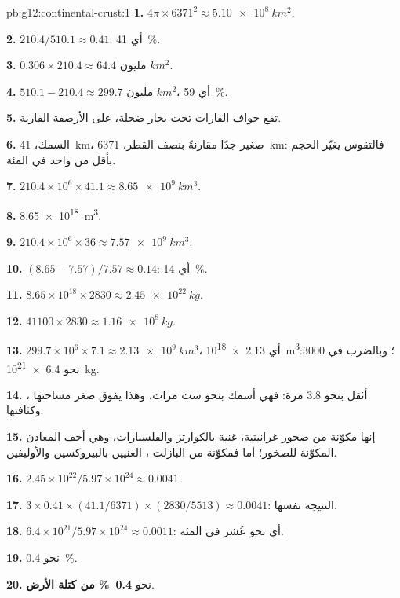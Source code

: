 \begin{solution}{pb:g12:continental-crust:1}
\textbf{1.} $4\pi \times 6371^2 \approx \qty{5.10e8}{km^2}$.

\textbf{2.} $210.4/510.1 \approx 0.41$: أي \qty{41}{\percent}.

\textbf{3.} $0.306 \times 210.4 \approx \num{64.4}\text{ مليون }\unit{km^2}$.

\textbf{4.} $510.1 - 210.4 \approx \num{299.7}\text{ مليون }\unit{km^2}$،
أي \qty{59}{\percent}.

\textbf{5.} تقع حواف القارات تحت بحار ضحلة، على
الأرصفة القارية.

\textbf{6.} السمك، \qty{41}{km}، صغير جدًا مقارنةً بنصف
القطر، \qty{6371}{km}: فالتقوس يغيّر الحجم بأقل من واحد
في المئة.

\textbf{7.} $210.4 \times 10^6 \times 41.1 \approx \qty{8.65e9}{km^3}$.

\textbf{8.} \qty{8.65e18}{m^3}.

\textbf{9.} $210.4 \times 10^6 \times 36 \approx \qty{7.57e9}{km^3}$.

\textbf{10.} $(8.65 - 7.57)/7.57 \approx 0.14$: أي \qty{14}{\percent}.

\textbf{11.} $8.65 \times 10^{18} \times 2830 \approx \qty{2.45e22}{kg}$.

\textbf{12.} $41100 \times 2830 \approx \qty{1.16e8}{kg}$.

\textbf{13.} $299.7 \times 10^6 \times 7.1 \approx \qty{2.13e9}{km^3}$، أي
\qty{2.13e18}{m^3}؛ وبالضرب في 3000: نحو \qty{6.4e21}{kg}.

\textbf{14.} ، أثقل بنحو 3.8 مرة: فهي أسمك بنحو ست
مرات، وهذا يفوق صغر مساحتها وكثافتها.

\textbf{15.} إنها مكوّنة من صخور غرانيتية، غنية بالكوارتز والفلسبارات، وهي
أخف المعادن المكوّنة للصخور؛ أما  فمكوّنة من البازلت
، الغنيين بالبيروكسين والأوليفين.

\textbf{16.} $2.45 \times 10^{22}/5.97 \times 10^{24} \approx 0.0041$.

\textbf{17.} $3 \times 0.41 \times (41.1/6371) \times (2830/5513) \approx
0.0041$: النتيجة نفسها.

\textbf{18.} $6.4 \times 10^{21}/5.97 \times 10^{24} \approx 0.0011$: أي نحو
عُشر في المئة.

\textbf{19.} نحو \qty{0.4}{\percent}.

\textbf{20.}  نحو \textbf{\qty{0.4}{\percent} من كتلة
الأرض}.
\end{solution}
